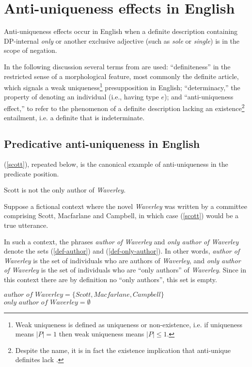 \section{Anti-uniqueness effects in English \label{sec:anti-uniqueness-english}}
Anti-uniqueness effects occur in English when a definite description containing DP-internal \textit{only} or another exclusive adjective (such as \textit{sole} or \textit{single}) is in the scope of negation.

In the following discussion several terms from \citet{cb2015} are used: ``definiteness'' in the restricted sense of a morphological feature, most commonly the definite article, which signals a weak uniqueness\footnote{Weak uniqueness is defined as uniqueness or non-existence, i.e. if uniqueness means $|P| = 1$ then weak uniqueness means $|P| \le 1$.} presupposition in English; ``determinacy,'' the property of denoting an individual (i.e., having type $e$); and ``anti-uniqueness effect,'' to refer to the phenomenon of a definite description lacking an existence\footnote{Despite the name, it is in fact the existence implication that anti-unique definites lack \citep[p. 385]{cb2015}.} entailment, i.e. a definite that is indeterminate.

\subsection{Predicative anti-uniqueness in English}
(\ref{scott}), repeated below, is the canonical example of anti-uniqueness in the predicate position.

\begin{exe}
	 Scott is not the only author of \textit{Waverley}.
\end{exe}

Suppose a fictional context where the novel \textit{Waverley} was written by a committee comprising Scott, Macfarlane and Campbell, in which case (\ref{scott}) would be a true utterance.

In such a context, the phrases \textit{author of Waverley} and \textit{only author of Waverley} denote the sets (\ref{def-author}) and (\ref{def-only-author}). In other words, \textit{author of Waverley} is the set of individuals who are authors of \textit{Waverley}, and \textit{only author of Waverley} is the set of individuals who are ``only authors'' of \textit{Waverley}. Since in this context there are by definition no ``only authors'', this set is empty.

\begin{exe}
	\ex \label{def-author} $\textit{author of Waverley} = \lbrace Scott, Macfarlane, Campbell \rbrace$
	\ex \label{def-only-author} $\textit{only author of Waverley} = \emptyset$
\end{exe}

